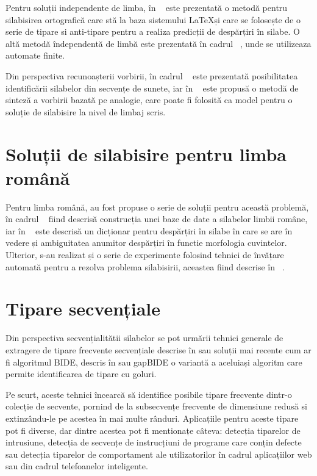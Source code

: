 Pentru soluții independente de limba, în ~\cite{bib:liang1983word} este prezentată o metodă pentru silabisirea ortografică care stă la baza sistemului \LaTeX și care se folosește de o serie de tipare si anti-tipare pentru a realiza predicții de despărțiri în silabe. O altă metodă îndependentă de limbă este prezentată în cadrul ~\cite{bib:kiraz1998multilingual}, unde se utilizeaza automate finite. 

Din perspectiva recunoașterii vorbirii, în cadrul ~\cite{bib:hunt1980experiments} este prezentată posibilitatea identificării silabelor din secvențe de sunete, iar în ~\cite{bib:damper1997pronunciation} este propusă o metodă de sinteză a vorbirii bazată pe analogie, care poate fi folosită ca model pentru o soluție de silabisire la nivel de limbaj scris. 

\section{Soluții de silabisire pentru limba română}

Pentru limba română, au fost propuse o serie de soluții pentru această problemă, în cadrul ~\cite{bib:dinu2004despartirea} fiind descrisă construcția unei baze de date a silabelor limbii române, iar în ~\cite{bib:barbu2008romanian} este descrisă un dicționar pentru despărțiri în silabe în care se are în vedere și ambiguitatea anumitor despărțiri în functie morfologia cuvintelor. Ulterior, s-au realizat și o serie de experimente folosind tehnici de învățare automată pentru a rezolva problema silabisirii, aceastea fiind descrise în ~\cite{bib:dinu2013romanian}.


\section{Tipare secvențiale}

Din perspectiva secvențialitătii silabelor se pot urmării tehnici generale de extragere de tipare frecvente secvențiale descrise în \cite{bib:agrawal1995mining} sau soluții mai recente cum ar fi algoritmul BIDE, descris în \cite{bib:wang2004bide} sau gapBIDE \cite{bib:gapbide} o variantă a aceluiași algoritm care permite identificarea de tipare cu goluri. 

Pe scurt, aceste tehnici încearcă să identifice posibile tipare frecvente dintr-o colecție de secvente, pornind de la subsecvențe frecvente de dimensiune redusă si extinzându-le pe acestea în mai multe rânduri. Aplicațiile pentru aceste tipare pot fi diverse, dar dintre acestea pot fi mentionațe câteva: detecția tiparelor de intrusiune, detecția de secvențe de instrucțiuni de programe care conțin defecte sau detecția tiparelor de comportament ale utilizatorilor în cadrul aplicațiilor web sau din cadrul telefoanelor inteligente.

